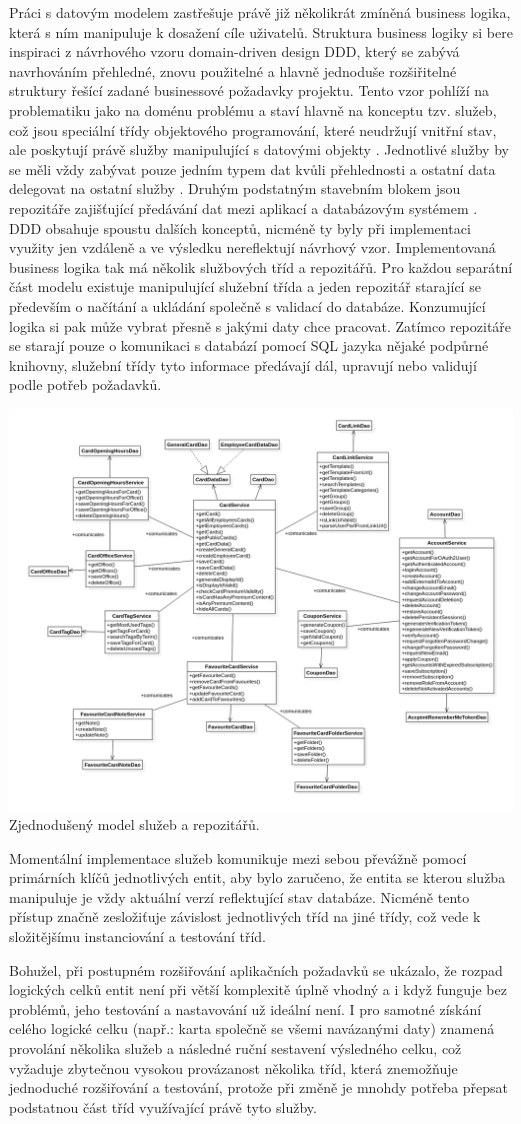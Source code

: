 \begin{itemize}
\begin{itemize}
		Práci s datovým modelem zastřešuje právě již několikrát zmíněná business logika, která s ním manipuluje k dosažení
		cíle uživatelů.
		Struktura business logiky si bere inspiraci z návrhového vzoru domain-driven design \ac{DDD}, který se zabývá
		navrhováním přehledné, znovu použitelné a hlavně jednoduše rozšiřitelné struktury řešící zadané businessové požadavky
		projektu.
		Tento vzor pohlíží na problematiku jako na doménu problému a staví hlavně na konceptu tzv. služeb,
		což jsou speciální třídy objektového programování, které
		neudržují vnitřní stav, ale poskytují právě služby manipulující s datovými objekty \cite{ddd_quickly}.
		Jednotlivé služby by se měli vždy zabývat pouze jedním typem dat kvůli přehlednosti a ostatní data delegovat na
		ostatní služby \cite{ddd_quickly}.
		Druhým podstatným stavebním blokem jsou repozitáře zajišťující předávání dat mezi aplikací a databázovým systémem
		\cite{ddd_quickly}.
		\ac{DDD} obsahuje spoustu dalších konceptů, nicméně ty byly při implementaci využity jen vzdáleně a ve výsledku
		nereflektují návrhový vzor.
		Implementovaná business logika tak má několik službových tříd a repozitářů.
		Pro každou separátní část modelu existuje manipulující služební třída a jeden repozitář starající se především o
		načítání a ukládání společně s validací do databáze.
		Konzumující logika si pak může vybrat přesně s jakými daty chce pracovat.
		Zatímco repozitáře se starají pouze o komunikaci s databází pomocí \ac{SQL} jazyka nějaké podpůrné knihovny,
		služební třídy tyto informace předávají dál, upravují nebo validují podle potřeb požadavků.

		\includegraphics[width=0.24\linewidth]{obrazky/sluzby_a_repozitare}\hfill
		Zjednodušený model služeb a repozitářů. %

		Momentální implementace služeb komunikuje mezi sebou převážně pomocí primárních klíčů jednotlivých entit, aby
		bylo zaručeno, že entita se kterou služba manipuluje je vždy aktuální verzí reflektující stav databáze.
		Nicméně tento přístup značně zesložiťuje závislost jednotlivých tříd na jiné třídy, což vede k složitějšímu
		instanciování a testování tříd.

		Bohužel, při postupném rozšiřování aplikačních požadavků se ukázalo, že rozpad logických celků entit není při větší
		komplexitě úplně vhodný a i když funguje bez problémů, jeho testování a nastavování už ideální není.
		I pro samotné získání celého logické celku (např.: karta společně se všemi navázanými daty) znamená provolání
		několika služeb a následné ruční sestavení výsledného celku, což vyžaduje zbytečnou vysokou provázanost několika tříd,
		která znemožňuje jednoduché rozšiřování a testování, protože při změně je mnohdy potřeba přepsat podstatnou část
		tříd využívající právě tyto služby.


\end{itemize}
\end{itemize}
